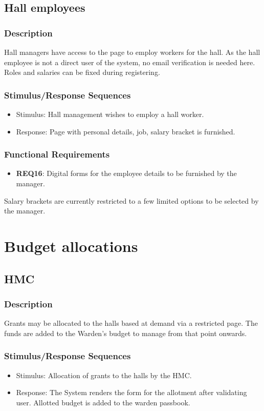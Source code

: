 \documentclass{scrreprt}
\begin{document}
\subsection{Hall employees}
\subsubsection{Description}
Hall managers have access to the page to employ workers for the hall. As the hall employee is not a direct user of the  system, no email verification is needed here. Roles and salaries can be fixed during registering.
\subsubsection{Stimulus/Response Sequences}
\begin{itemize}
    \item Stimulus: Hall management wishes to employ a hall worker.
    \item Response: Page with personal details, job, salary bracket is furnished.
\end{itemize}

\subsubsection{Functional Requirements}
\begin{itemize}
    \item \textbf{REQ16}: Digital forms for the employee details to be furnished by the manager.
\end{itemize}
Salary brackets are currently restricted to a few limited options to be selected by the manager.

\section{Budget allocations}
\subsection{HMC}
\subsubsection{Description}
Grants may be allocated to the halls based at demand via a restricted page. The funds are added to the Warden's budget to manage from that point onwards. 
\subsubsection{Stimulus/Response Sequences}
\begin{itemize}
    \item Stimulus: Allocation of grants to the halls by the HMC.
    \item Response: The System renders the form for the allotment after validating user. Allotted budget is added to the warden passbook.
\end{itemize}
\end{document}
